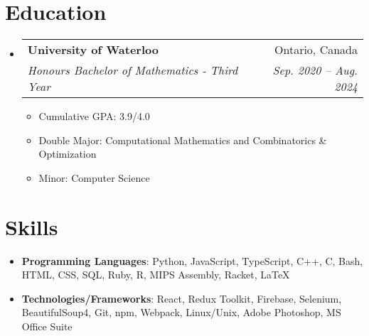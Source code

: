 \documentclass[letterpaper,11pt]{article}
\makeatletter
\newcommand{\resumeSubheading}[4]{
  \vspace{-1pt}\item
    \begin{tabular*}{0.97\textwidth}{l@{\extracolsep{\fill}}r}
      \textbf{#1} & #2 \\
      \textit{\small#3} & \textit{\small #4} \\
    \end{tabular*}\vspace{0pt}
}
\newcommand{\resumeSubHeadingListStart}{\begin{itemize}[leftmargin=*]}
\newcommand{\resumeSubHeadingListEnd}{\end{itemize}}
\newcommand{\resumeItemListStart}{\begin{itemize}}
\newcommand{\resumeItemListEnd}{\end{itemize}\vspace{0pt}}
\makeatother
\begin{document}
\section{Education}
\resumeSubHeadingListStart
\resumeSubheading
{University of Waterloo}{Ontario, Canada}
{Honours Bachelor of Mathematics - Third Year}{Sep. 2020 -- Aug. 2024}
\begin{itemize}
	\item Cumulative GPA: 3.9/4.0
	\item Double Major: Computational Mathematics and Combinatorics \& Optimization
	\item Minor: Computer Science
\end{itemize}
\resumeSubHeadingListEnd






%
\section{Skills}
\resumeSubHeadingListStart
\item{
            \textbf{Programming Languages}{: Python, JavaScript, TypeScript, C++, C, Bash, HTML, CSS, SQL, Ruby, R, MIPS Assembly, Racket, LaTeX}
            \hfill
      }
\item{
            \textbf{Technologies/Frameworks}{: React, Redux Toolkit, Firebase, Selenium, BeautifulSoup4, Git, npm, Webpack, Linux/Unix, Adobe Photoshop, MS Office Suite}
      }
\resumeSubHeadingListEnd


\end{document}
